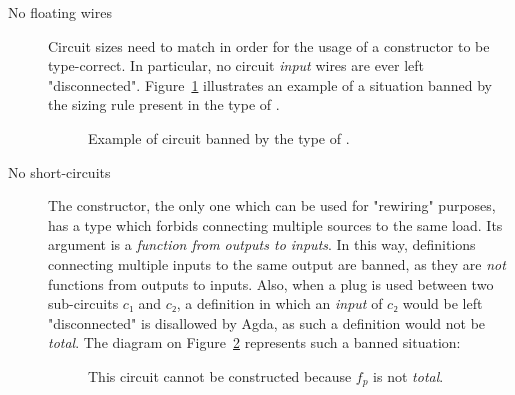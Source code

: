             \begin{description}
                \item[No floating wires] Circuit sizes need to match in order for the usage of a constructor
                    to be type-correct. In particular, no circuit \emph{input} wires are ever left "disconnected".
                    Figure~\ref{fig:sequencing-floating} illustrates an example of a situation banned by the sizing rule present
                    in the type of .

                    \begin{figure}[h]
                        \caption{Example of circuit banned by the type of .\label{fig:sequencing-floating}}
                    \end{figure}

                \item [No short-circuits] The  constructor, the only one which can be used for
                    "rewiring" purposes, has a type which forbids connecting multiple sources to the same load.
                    Its argument is a \emph{function from outputs to inputs}.
                    In this way, definitions connecting multiple inputs to the same output are banned,
                    as they are \emph{not} functions from outputs to inputs.
                    Also, when a plug is used between two sub-circuits $c₁$ and $c₂$,
                    a definition in which an \emph{input} of $c₂$ would be left "disconnected" is disallowed by Agda,
                    as such a definition would not be \emph{total}.
                    The diagram on Figure~\ref{fig:plug-seq-disconnected-input} represents such a banned situation:

                    \begin{figure}[h]
                        \caption{This circuit cannot be constructed because $f_{p}$ is not \emph{total}.\label{fig:plug-seq-disconnected-input}}
                    \end{figure}
            \end{description}

